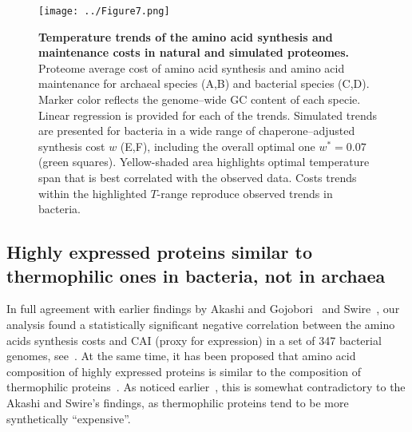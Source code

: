\documentclass[10pt,letterpaper]{article}
\begin{document}
\begin{figure}[h!]
\texttt{[image: ../Figure7.png]}
\caption{
{\bf Temperature trends of the amino acid synthesis and maintenance costs in natural and simulated proteomes.}
Proteome average cost of amino acid synthesis and amino acid maintenance for archaeal species (A,B) and bacterial species (C,D). Marker color reflects the genome--wide GC content of each specie. Linear regression is provided for each of the trends.
Simulated trends are presented for bacteria in a wide range of chaperone--adjusted synthesis cost $w$ (E,F), including the overall optimal one $w^*=0.07$ (green squares). Yellow-shaded area highlights optimal temperature span that is best correlated with the observed data. Costs trends within the highlighted $T$-range reproduce observed trends in bacteria.
}
\label{fig:fig6}
\end{figure}

\subsection*{Highly expressed proteins similar to thermophilic ones in bacteria, not in archaea}

In full agreement with earlier findings by Akashi and Gojobori~\cite{Akashi2002Metabolic} and Swire~\cite{Swire2007Selection}, our analysis found a statistically significant negative correlation between the amino acids synthesis costs and CAI (proxy for expression) in a set of 347 bacterial genomes, see~. At the same time, it has been proposed that amino acid composition of highly expressed proteins is similar to the composition of thermophilic proteins~\cite{Cherry2010Highly}. As noticed earlier~\cite{Serohijos2012Protein}, this is somewhat contradictory to the Akashi and Swire's findings, as thermophilic proteins tend to be more synthetically ``expensive''.
\end{document}
